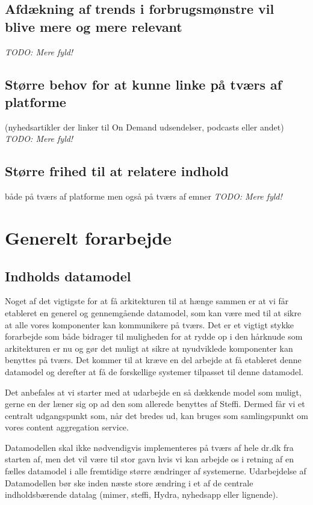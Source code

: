 \documentclass{article}
\begin{document}
\subsection{Afdækning af trends i forbrugsmønstre vil blive mere og mere relevant}
    \textit{TODO: Mere fyld!}
\subsection{Større behov for at kunne linke på tværs af platforme}
 (nyhedsartikler der linker til On Demand udsendelser, podcasts eller andet)
    \textit{TODO: Mere fyld!}
\subsection{Større frihed til at relatere indhold}
 både på tværs af platforme men også på tværs af emner
    \textit{TODO: Mere fyld!}


\section{Generelt forarbejde}
\subsection{Indholds datamodel}
Noget af det vigtigste for at få arkitekturen til at hænge sammen er at vi får etableret en generel og gennemgående datamodel, som kan være med til at sikre at alle vores komponenter kan kommunikere på tværs. Det er et vigtigt stykke forarbejde som både bidrager til muligheden for at rydde op i den hårknude som arkitekturen er nu og gør det muligt at sikre at nyudviklede komponenter kan benyttes på tværs. Det kommer til at kræve en del arbejde at få etableret denne datamodel og derefter at få de forskellige systemer tilpasset til denne datamodel.

Det anbefales at vi starter med at udarbejde en så dækkende model som muligt, gerne en der læner sig op ad den som allerede benyttes af Steffi. Dermed får vi et centralt udgangspunkt som, når det bredes ud, kan bruges som samlingspunkt om vores content aggregation service.

Datamodellen skal ikke nødvendigvis implementeres på tværs af hele dr.dk fra starten af, men det vil være til stor gavn hvis vi kan arbejde os i retning af en fælles datamodel i alle fremtidige større ændringer af systemerne.
Udarbejdelse af Datamodellen bør ske inden næste store ændring i et af de centrale indholdsbærende datalag (mimer, steffi, Hydra, nyhedsapp eller lignende).
\end{document}
